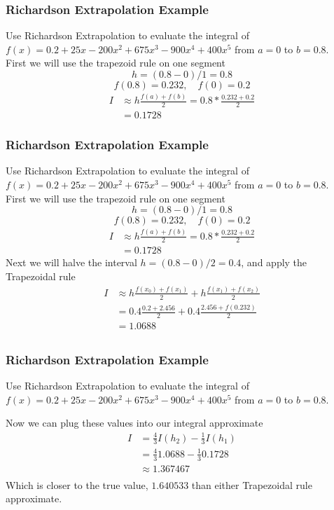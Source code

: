 \documentclass{if-beamer}
\begin{document}
\begin{frame}[t]
	\frametitle{Richardson Extrapolation Example}
	Use Richardson Extrapolation to evaluate the integral of\\ $f(x) = 0.2 + 25x-200x^2+675x^3-900x^4+400x^5$ from $a = 0$ to $b = 0.8$. \\\vspace{10pt}
	First we will use the trapezoid rule on one segment\\
	$$ h = (0.8-0)/1 = 0.8$$
	$$ f(0.8) = 0.232, \quad f(0) = 0.2$$
	\begin{align*}
		I &\approx h\frac{f(a)+f(b)}{2} = 0.8*\frac{0.232+0.2}{2} \\
		&= 0.1728
	\end{align*}
\end{frame}

\begin{frame}[t]
	\frametitle{Richardson Extrapolation Example}
	Use Richardson Extrapolation to evaluate the integral of\\ $f(x) = 0.2 + 25x-200x^2+675x^3-900x^4+400x^5$ from $a = 0$ to $b = 0.8$. \\\vspace{10pt}
	First we will use the trapezoid rule on one segment\\
	$$ h = (0.8-0)/1 = 0.8$$
	$$ f(0.8) = 0.232, \quad f(0) = 0.2$$
	\begin{align*}
	I &\approx h\frac{f(a)+f(b)}{2} = 0.8*\frac{0.232+0.2}{2} \\
	 &= 0.1728
	\end{align*}
	Next we will halve the interval $h = (0.8-0)/2 = 0.4$, and apply the Trapezoidal rule
	\begin{align*}
	 I &\approx h\frac{f(x_0)+f(x_1)}{2} + h\frac{f(x_1)+f(x_2)}{2}\\
	 &= 0.4\frac{0.2+2.456}{2} + 0.4\frac{2.456+f(0.232)}{2}\\ 
	 &= 1.0688 \\
	\end{align*}
\end{frame}

\begin{frame}
	\frametitle{Richardson Extrapolation Example}
	Use Richardson Extrapolation to evaluate the integral of\\ $f(x) = 0.2 + 25x-200x^2+675x^3-900x^4+400x^5$ from $a = 0$ to $b = 0.8$. \\\vspace{10pt}
	
	Now we can plug these values into our integral approximate
	\begin{align*}
		I &= \frac{4}{3}I(h_2)-\frac{1}{3}I(h_1)\\
		&= \frac{4}{3}1.0688-\frac{1}{3}0.1728\\
		&\approx 1.367467\\
	\end{align*}
	Which is closer to the true value, $1.640533$ than either Trapezoidal rule approximate.
\end{frame}
\end{document}
